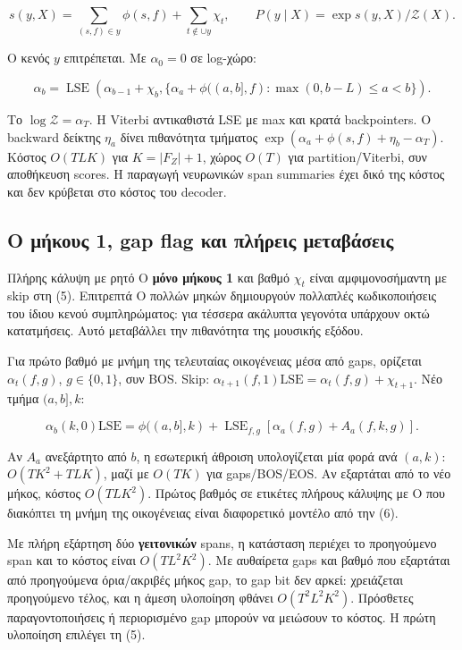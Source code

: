 \documentclass[
  10pt,
  a4paper,
]{report}
\begin{document}
\[
s(y,X)=\sum_{(s,f)\in y}\phi(s,f)+\sum_{t\notin\cup y}\chi_t,\qquad
P(y\mid X)=\exp s(y,X)/\mathcal Z(X).
\]

Ο κενός \(y\) επιτρέπεται. Με \(\alpha_0=0\) σε log-χώρο:

\[
\alpha_b=\operatorname{LSE}\left(\alpha_{b-1}+\chi_b,
\{\alpha_a+\phi((a,b],f):\max(0,b-L)\le a<b\}\right).\tag{5}
\]

Το \(\log\mathcal Z=\alpha_T\). Η Viterbi αντικαθιστά LSE με max και
κρατά backpointers. Ο backward δείκτης \(\eta_a\) δίνει πιθανότητα
τμήματος \(\exp(\alpha_a+\phi(s,f)+\eta_b-\alpha_T)\). Κόστος \(O(TLK)\)
για \(K=|F_Z|+1\), χώρος \(O(T)\) για partition/Viterbi, συν αποθήκευση
scores. Η παραγωγή νευρωνικών span summaries έχει δικό της κόστος και
δεν κρύβεται στο κόστος του decoder.

\subsection{O μήκους 1, gap flag και πλήρεις
μεταβάσεις}\label{o-ux3bcux3aeux3baux3bfux3c5ux3c2-1-gap-flag-ux3baux3b1ux3b9-ux3c0ux3bbux3aeux3c1ux3b5ux3b9ux3c2-ux3bcux3b5ux3c4ux3b1ux3b2ux3acux3c3ux3b5ux3b9ux3c2}

Πλήρης κάλυψη με ρητό O \textbf{μόνο μήκους 1} και βαθμό \(\chi_t\)
είναι αμφιμονοσήμαντη με skip στη (5). Επιτρεπτά O πολλών μηκών
δημιουργούν πολλαπλές κωδικοποιήσεις του ίδιου κενού συμπληρώματος: για
τέσσερα ακάλυπτα γεγονότα υπάρχουν οκτώ κατατμήσεις. Αυτό μεταβάλλει την
πιθανότητα της μουσικής εξόδου.

Για πρώτο βαθμό με μνήμη της τελευταίας οικογένειας μέσα από gaps,
ορίζεται \(\alpha_t(f,g)\), \(g\in\{0,1\}\), συν BOS. Skip:
\(\alpha_{t+1}(f,1)\mathrel{\mathrm{LSE}=}\alpha_t(f,g)+\chi_{t+1}\).
Νέο τμήμα \((a,b],k\):

\[
\alpha_b(k,0)\mathrel{\mathrm{LSE}=}\phi((a,b],k)+\operatorname{LSE}_{f,g}[\alpha_a(f,g)+A_a(f,k,g)].\tag{6}
\]

Αν \(A_a\) ανεξάρτητο από \(b\), η εσωτερική άθροιση υπολογίζεται μία
φορά ανά \((a,k)\): \(O(TK^2+TLK)\), μαζί με \(O(TK)\) για gaps/BOS/EOS.
Αν εξαρτάται από το νέο μήκος, κόστος \(O(TLK^2)\). Πρώτος βαθμός σε
ετικέτες πλήρους κάλυψης με O που διακόπτει τη μνήμη της οικογένειας
είναι διαφορετικό μοντέλο από την (6).

Με πλήρη εξάρτηση δύο \textbf{γειτονικών} spans, η κατάσταση περιέχει το
προηγούμενο span και το κόστος είναι \(O(TL^2K^2)\). Με αυθαίρετα gaps
και βαθμό που εξαρτάται από προηγούμενα όρια/ακριβές μήκος gap, το gap
bit δεν αρκεί: χρειάζεται προηγούμενο τέλος, και η άμεση υλοποίηση
φθάνει \(O(T^2L^2K^2)\). Πρόσθετες παραγοντοποιήσεις ή περιορισμένο gap
μπορούν να μειώσουν το κόστος. Η πρώτη υλοποίηση επιλέγει τη (5).
\end{document}
